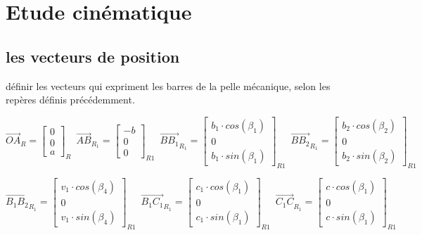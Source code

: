 \documentclass[12pt,a4paper,twoside]{article}
\begin{document}
\section{Etude cinématique}


\subsection{les vecteurs de position}

définir les vecteurs qui expriment les barres de la pelle mécanique, selon les repères définis précédemment. 

\begin{equation}
\vec{OA}_R=
\begin{bmatrix}
0 \\
0\\
a
\end{bmatrix}_{R} \enspace
\vec{AB}_{R_{1}}=
\begin{bmatrix}
-b \\
0\\
0
\end{bmatrix}_{R1} \enspace
\vec{B B_1}_{R_{1}}=
\begin{bmatrix}
b_1\cdot cos(\beta_1) \\
0\\
b_1\cdot sin(\beta_1)
\end{bmatrix}_{R1} \enspace
\vec{B B_2}_{R_{1}}=
\begin{bmatrix}
b_2\cdot cos(\beta_2) \\
0\\
b_2\cdot sin(\beta_2)
\end{bmatrix}_{R1} \enspace
\end{equation}

\begin{equation}
\vec{B_1 B_2}_{R_{1}}=
\begin{bmatrix}
v_1\cdot cos(\beta_4) \\
0\\
v_1\cdot sin(\beta_4)
\end{bmatrix}_{R1} \enspace
\vec{B_1 C_1}_{R_{1}}=
\begin{bmatrix}
c_1\cdot cos(\beta_1) \\
0\\
c_1\cdot sin(\beta_1)
\end{bmatrix}_{R1} \enspace
\vec{C_1 C}_{R_{1}}=
\begin{bmatrix}
c\cdot cos(\beta_1) \\
0\\
c\cdot sin(\beta_1)
\end{bmatrix}_{R1} \enspace
\end{equation}
\end{document}

